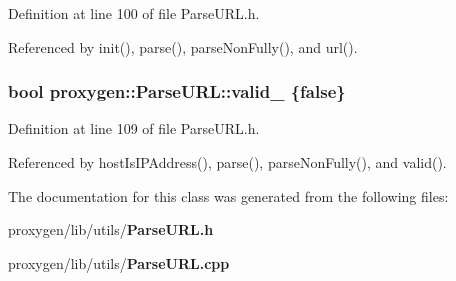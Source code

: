Definition at line 100 of file Parse\+U\+R\+L.\+h.



Referenced by init(), parse(), parse\+Non\+Fully(), and url().

\subsubsection[{valid\+\_\+}]{\setlength{\rightskip}{0pt plus 5cm}bool proxygen\+::\+Parse\+U\+R\+L\+::valid\+\_\+ \{false\}\hspace{0.3cm}{\ttfamily [private]}}\label{classproxygen_1_1ParseURL_a451f41cbb61ad4c365dcd4213247eba2}


Definition at line 109 of file Parse\+U\+R\+L.\+h.



Referenced by host\+Is\+I\+P\+Address(), parse(), parse\+Non\+Fully(), and valid().



The documentation for this class was generated from the following files\+:\begin{DoxyCompactItemize}
\item 
proxygen/lib/utils/{\bf Parse\+U\+R\+L.\+h}\item 
proxygen/lib/utils/{\bf Parse\+U\+R\+L.\+cpp}\end{DoxyCompactItemize}
